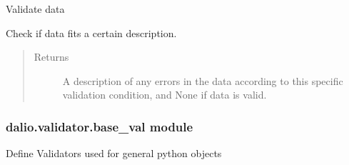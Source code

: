 \documentclass[letterpaper,10pt,english]{sphinxmanual}
\begin{document}
\begin{fulllineitems}
\begin{fulllineitems}
\label{\detokenize{dalio.validator:dalio.validator.array_val.HAS_DIMS.validate}}
Validate data

Check if data fits a certain description.
\begin{quote}\begin{description}
\item[{Returns}] \leavevmode
A description of any errors in the data according to this
specific validation condition, and None if data is valid.

\end{description}\end{quote}

\end{fulllineitems}


\end{fulllineitems}



\subsubsection{dalio.validator.base\_val module}
\label{\detokenize{dalio.validator:module-dalio.validator.base_val}}\label{\detokenize{dalio.validator:dalio-validator-base-val-module}}
Define Validators used for general python objects
\end{document}
